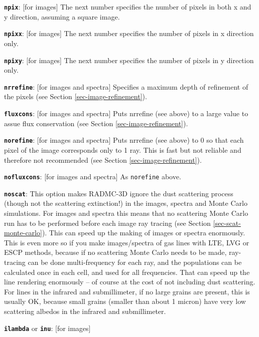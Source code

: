 \documentclass{report}
\newenvironment{options}%
  {\begin{list}{}{%
    \setlength{\topsep}{1em}%
    \setlength{\parskip}{0em}%
    \setlength{\parsep}{0em}%
    \setlength{\itemsep}{1em}%
    \setlength{\rightmargin}{0em}%
    \setlength{\leftmargin}{9em}%
    \setlength{\labelsep}{1em}%
    \setlength{\labelwidth}{6em}%
    \setlength{\itemindent}{0em}}\normalfont}%
  {\end{list}}
\begin{document}
\begin{options}
\item[{\small\tt\bf npix}:\hfill] [for images] The next number specifies the number of
  pixels in both x and y direction, assuming a square image.
\item[{\small\tt\bf npixx}:\hfill] [for images] The next number specifies the number of
  pixels in x direction only. 
\item[{\small\tt\bf npixy}:\hfill] [for images] The next number specifies the number of
  pixels in y direction only.
\item[{\small\tt\bf nrrefine}:\hfill] [for images and spectra] Specifies a maximum depth of
  refinement of the pixels (see Section \ref{sec-image-refinement}).
\item[{\small\tt\bf fluxcons}:\hfill] [for images and spectra] Puts nrrefine (see above) to
  a large value to assue flux conservation (see Section \ref{sec-image-refinement}).
\item[{\small\tt\bf norefine}:\hfill] [for images and spectra] Puts
  nrrefine (see above) to 0 so that each pixel of the image corresponds only
  to 1 ray. This is fast but not reliable and therefore not recommended (see
  Section \ref{sec-image-refinement}).
\item[{\small\tt\bf nofluxcons}:\hfill] [for images and spectra] As
  {\small\tt norefine} above.
\item[{\small\tt\bf noscat}:\hfill] This option makes RADMC-3D ignore the
  dust scattering process (though not the scattering extinction!) in the
  images, spectra and Monte Carlo simulations. For images and spectra this
  means that no scattering Monte Carlo run has to be performed before each
  image ray tracing (see Section \ref{sec-scat-monte-carlo}). This can speed
  up the making of images or spectra enormously. This is even more so if you
  make images/spectra of gas lines with LTE, LVG or ESCP methods, because if
  no scattering Monte Carlo needs to be made, ray-tracing can be done
  multi-frequency for each ray, and the populations can be calculated once
  in each cell, and used for all frequencies. That can speed up the line
  rendering enormously -- of course at the cost of not including dust
  scattering. For lines in the infrared and submillimeter, if no large
  grains are present, this is usually OK, because small grains (smaller than
  about 1 micron) have very low scattering albedos in the infrared and
  submillimeter.
\item[{\small\tt\bf ilambda} or {\small\tt\bf inu}:\hfill] [for images]

\end{options}
\end{document}
